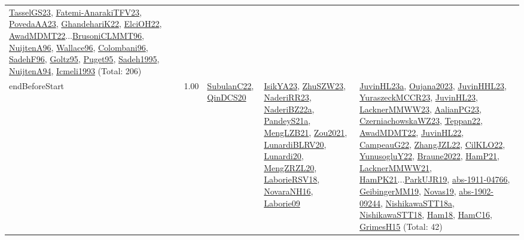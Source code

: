 {\begin{longtable}{p{3cm}r>{\raggedright\arraybackslash}p{6cm}>{\raggedright\arraybackslash}p{6cm}>{\raggedright\arraybackslash}p{8cm}}
\hyperref[detail:TasselGS23]{TasselGS23}, \hyperref[detail:Fatemi-AnarakiTFV23]{Fatemi-AnarakiTFV23}, \hyperref[detail:PovedaAA23]{PovedaAA23}, \hyperref[detail:GhandehariK22]{GhandehariK22}, \hyperref[detail:ElciOH22]{ElciOH22}, \hyperref[detail:AwadMDMT22]{AwadMDMT22}...\hyperref[detail:BrusoniCLMMT96]{BrusoniCLMMT96}, \hyperref[detail:NuijtenA96]{NuijtenA96}, \hyperref[detail:Wallace96]{Wallace96}, \hyperref[detail:Colombani96]{Colombani96}, \hyperref[detail:SadehF96]{SadehF96}, \hyperref[detail:Goltz95]{Goltz95}, \hyperref[detail:Puget95]{Puget95}, \hyperref[detail:Sadeh1995]{Sadeh1995}, \hyperref[detail:NuijtenA94]{NuijtenA94}, \hyperref[detail:Icmeli1993]{Icmeli1993} (Total: 206)\\
\index{endBeforeStart}\index{Constraints!endBeforeStart}endBeforeStart &  1.00 & \hyperref[detail:SubulanC22]{SubulanC22}, \hyperref[detail:QinDCS20]{QinDCS20} & \hyperref[detail:IsikYA23]{IsikYA23}, \hyperref[detail:ZhuSZW23]{ZhuSZW23}, \hyperref[detail:NaderiRR23]{NaderiRR23}, \hyperref[detail:NaderiBZ22a]{NaderiBZ22a}, \hyperref[detail:PandeyS21a]{PandeyS21a}, \hyperref[detail:MengLZB21]{MengLZB21}, \hyperref[detail:Zou2021]{Zou2021}, \hyperref[detail:LunardiBLRV20]{LunardiBLRV20}, \hyperref[detail:Lunardi20]{Lunardi20}, \hyperref[detail:MengZRZL20]{MengZRZL20}, \hyperref[detail:LaborieRSV18]{LaborieRSV18}, \hyperref[detail:NovaraNH16]{NovaraNH16}, \hyperref[detail:Laborie09]{Laborie09} & \hyperref[detail:JuvinHL23a]{JuvinHL23a}, \hyperref[detail:Oujana2023]{Oujana2023}, \hyperref[detail:JuvinHHL23]{JuvinHHL23}, \hyperref[detail:YuraszeckMCCR23]{YuraszeckMCCR23}, \hyperref[detail:JuvinHL23]{JuvinHL23}, \hyperref[detail:LacknerMMWW23]{LacknerMMWW23}, \hyperref[detail:AalianPG23]{AalianPG23}, \hyperref[detail:CzerniachowskaWZ23]{CzerniachowskaWZ23}, \hyperref[detail:Teppan22]{Teppan22}, \hyperref[detail:AwadMDMT22]{AwadMDMT22}, \hyperref[detail:JuvinHL22]{JuvinHL22}, \hyperref[detail:CampeauG22]{CampeauG22}, \hyperref[detail:ZhangJZL22]{ZhangJZL22}, \hyperref[detail:CilKLO22]{CilKLO22}, \hyperref[detail:YunusogluY22]{YunusogluY22}, \hyperref[detail:Braune2022]{Braune2022}, \hyperref[detail:HamP21]{HamP21}, \hyperref[detail:LacknerMMWW21]{LacknerMMWW21}, \hyperref[detail:HamPK21]{HamPK21}...\hyperref[detail:ParkUJR19]{ParkUJR19}, \hyperref[detail:abs-1911-04766]{abs-1911-04766}, \hyperref[detail:GeibingerMM19]{GeibingerMM19}, \hyperref[detail:Novas19]{Novas19}, \hyperref[detail:abs-1902-09244]{abs-1902-09244}, \hyperref[detail:NishikawaSTT18a]{NishikawaSTT18a}, \hyperref[detail:NishikawaSTT18]{NishikawaSTT18}, \hyperref[detail:Ham18]{Ham18}, \hyperref[detail:HamC16]{HamC16}, \hyperref[detail:GrimesH15]{GrimesH15} (Total: 42)\\

\end{longtable}}

